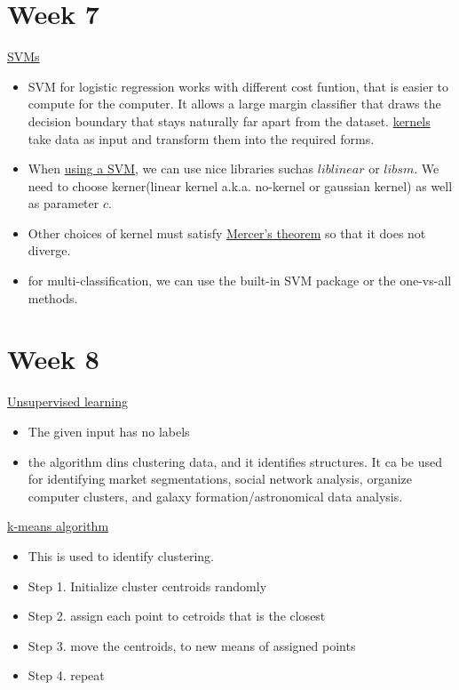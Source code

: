 \documentclass[12pt]{article}
\begin{document}
\newpage\section*{Week 7}
\underline{SVMs}
\begin{itemize}
	\item SVM for logistic regression works with different cost funtion, that is easier to compute for the computer. It allows a large margin classifier that draws the decision boundary that stays naturally far apart from the dataset. \underline{kernels} take data as input and transform them into the required forms.
	\item When \underline{using a SVM}, we can use nice libraries suchas $liblinear$ or $libsm$. We need to choose kerner(linear kernel a.k.a. no-kernel or gaussian kernel) as well as parameter $c$.
	\item Other choices of kernel must satisfy \underline{Mercer's theorem} so that it does not diverge.
	\item for multi-classification, we can use the built-in SVM package or the one-vs-all methods.
	
	\end{itemize}

\newpage\section*{Week 8}
\underline{Unsupervised learning}
\begin{itemize}
	\item The given input has no labels
	\item the algorithm dins clustering data, and it identifies structures. It ca be used for identifying market segmentations, social network analysis, organize computer clusters, and galaxy formation/astronomical data analysis.
\end{itemize}

\underline{k-means algorithm}
\begin{itemize}
	\item This is used to identify clustering.
	\item Step 1. Initialize cluster centroids randomly
	\item Step 2. assign each point to cetroids that is the closest
	\item Step 3. move the centroids, to new means of assigned points
	\item Step 4. repeat
\end{itemize}
\end{document}

